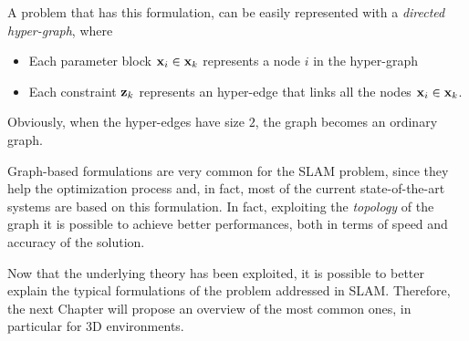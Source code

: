 A problem that has this formulation, can be easily represented with a \textit{directed hyper-graph}, where

\begin{itemize}
    \item Each parameter block $\mathbf{x}_i \in \mathbf{x}_k$ represents a node $i$ in the hyper-graph
    \item Each constraint $\mathbf{z}_k$ represents an hyper-edge that links all the nodes $\mathbf{x}_i \in \mathbf{x}_k$.
\end{itemize}

\noindent Obviously, when the hyper-edges have size $2$, the graph becomes an ordinary graph. 

Graph-based formulations are very common for the SLAM problem, since they help the optimization process and, in fact, most of the current state-of-the-art systems are based on this formulation. In fact, exploiting the \textit{topology} of the graph it is possible to achieve better performances, both in terms of speed and accuracy of the solution.

\vspace{15px}
Now that the underlying theory has been exploited, it is possible to better explain the typical formulations of the problem addressed in SLAM. Therefore, the next Chapter will propose an overview of the most common ones, in particular for 3D environments.